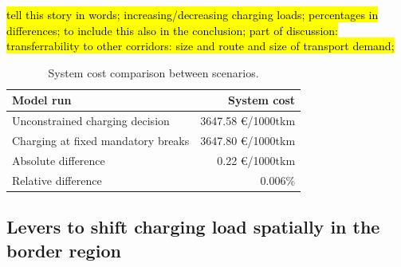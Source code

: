 \documentclass[preprint,10pt,review, authoryear]{elsarticle}
\begin{document}
    \hl{tell this story in words; increasing/decreasing charging loads; percentages in differences; to include this also in the conclusion; part of discussion: transferrability to other corridors: size and route and size of transport demand;}
    \begin{table}[H]
    \centering
    \caption{System cost comparison between scenarios.}
    \label{tab:cost_comparison}
    \begin{tabular}{@{}lr@{}}
    \toprule
    \textbf{Model run} & \textbf{System cost} \\ \midrule
    Unconstrained charging decision & 3647.58 \euro/1000tkm \\
    Charging at fixed mandatory breaks & 3647.80 \euro/1000tkm \\ \hline
    Absolute difference & 0.22 \euro/1000tkm\\
    Relative difference & 0.006\% \\ \bottomrule
    \end{tabular}
\end{table}


    \subsection{Levers to shift charging load spatially in the border region}
   
\end{document}
